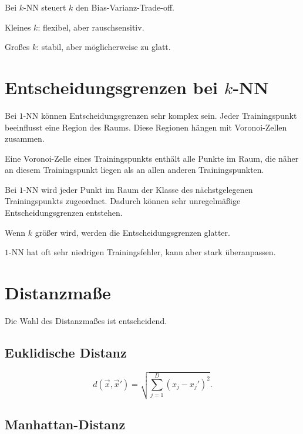 \begin{conceptbox}
Bei \(k\)-NN steuert \(k\) den Bias-Varianz-Trade-off.

Kleines \(k\): flexibel, aber rauschsensitiv.

Großes \(k\): stabil, aber möglicherweise zu glatt.
\end{conceptbox}

\section{Entscheidungsgrenzen bei \(k\)-NN}

Bei \(1\)-NN können Entscheidungsgrenzen sehr komplex sein.
Jeder Trainingspunkt beeinflusst eine Region des Raums.
Diese Regionen hängen mit Voronoi-Zellen zusammen.

\begin{definitionbox}
Eine Voronoi-Zelle eines Trainingspunkts enthält alle Punkte im Raum, die näher an diesem Trainingspunkt liegen als an allen anderen Trainingspunkten.
\end{definitionbox}

Bei \(1\)-NN wird jeder Punkt im Raum der Klasse des nächstgelegenen Trainingspunkts zugeordnet.
Dadurch können sehr unregelmäßige Entscheidungsgrenzen entstehen.

Wenn \(k\) größer wird, werden die Entscheidungsgrenzen glatter.

\begin{notebox}
\(1\)-NN hat oft sehr niedrigen Trainingsfehler, kann aber stark überanpassen.
\end{notebox}

\section{Distanzmaße}

Die Wahl des Distanzmaßes ist entscheidend.

\subsection{Euklidische Distanz}

\[
    d(\vec{x},\vec{x}')
    =
    \sqrt{
        \sum_{j=1}^{D}
        (x_j-x_j')^2
    }.
\]

\subsection{Manhattan-Distanz}


